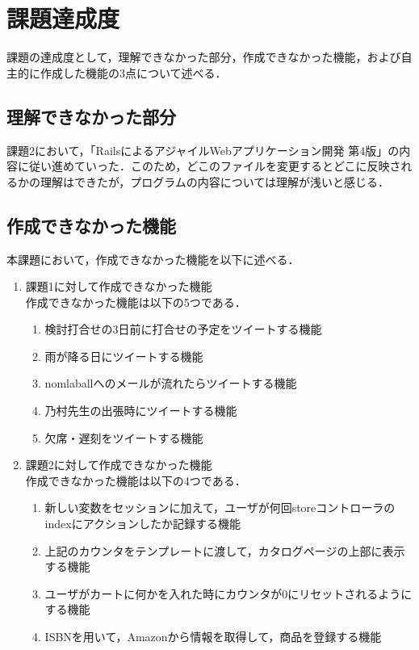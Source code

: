 \documentclass[fleqn, 14pt]{extarticlej}
\begin{document}
\section{課題達成度}
課題の達成度として，理解できなかった部分，作成できなかった機能，および自主的に作成した機能の3点について述べる．

\subsection{理解できなかった部分}
課題2において，「RailsによるアジャイルWebアプリケーション開発 第4版」の内容に従い進めていった．このため，どこのファイルを変更するとどこに反映されるかの理解はできたが，プログラムの内容については理解が浅いと感じる．
\subsection{作成できなかった機能}
本課題において，作成できなかった機能を以下に述べる．
\begin{enumerate}
  \item 課題1に対して作成できなかった機能\\
    作成できなかった機能は以下の5つである．
   \begin{enumerate}
    \item  検討打合せの3日前に打合せの予定をツイートする機能
    \item  雨が降る日にツイートする機能
    \item  nomlaballへのメールが流れたらツイートする機能
    \item  乃村先生の出張時にツイートする機能
    \item  欠席・遅刻をツイートする機能
   \end{enumerate}
 \item 課題2に対して作成できなかった機能\\
   作成できなかった機能は以下の4つである．
   \begin{enumerate}
   \item  新しい変数をセッションに加えて，ユーザが何回storeコントローラのindexにアクションしたか記録する機能
   \item 上記のカウンタをテンプレートに渡して，カタログページの上部に表示する機能
   \item ユーザがカートに何かを入れた時にカウンタが0にリセットされるようにする機能
   \item ISBNを用いて，Amazonから情報を取得して，商品を登録する機能
   \end{enumerate}
\end{enumerate}
\end{document}
